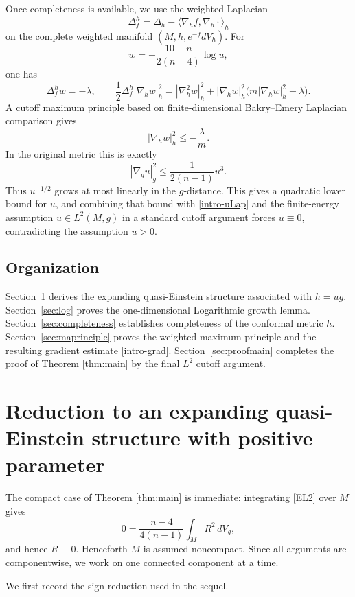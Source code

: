 \documentclass[11pt]{amsart}
\numberwithin{equation}{section}
\newcommand{\Hess}{\nabla^2}
\begin{document}
Once completeness is available, we use the weighted Laplacian
$$
        \Delta_f^h=\Delta_h-\langle\nabla_h f,\nabla_h\cdot\rangle_h
$$
on the complete weighted manifold $(M,h,e^{-f}dV_h)$.  For
$$
        w=-\frac{10-n}{2(n-4)}\log u,
$$
one has
$$
        \Delta_f^h w=-\lambda,
        \qquad
        \frac12\Delta_f^h |\nabla_h w|_h^2
        =|\Hess_h w|_h^2+|\nabla_h w|_h^2\bigl(m|\nabla_h w|_h^2+\lambda\bigr).
$$
A cutoff maximum principle based on finite-dimensional Bakry--Emery Laplacian comparison gives
$$
        |\nabla_h w|_h^2\le -\frac{\lambda}{m}.
$$
In the original metric this is exactly
\begin{equation}\label{intro-grad}
        |\nabla_g u|_g^2\le \frac1{2(n-1)}u^3 .
\end{equation}
Thus $u^{-1/2}$ grows at most linearly in the $g$-distance.  This gives a quadratic lower bound for $u$, and combining that bound with \eqref{intro-uLap} and the finite-energy assumption $u\in L^2(M,g)$ in a standard cutoff argument forces $u\equiv0$, contradicting the assumption $u>0$.

\subsection{Organization}

Section~\ref{sec:reduction} derives the expanding quasi-Einstein structure associated with $h=ug$.  Section~\ref{sec:log} proves the one-dimensional Logarithmic growth lemma.  Section~\ref{sec:completeness} establishes completeness of the conformal metric $h$.  Section~\ref{sec:maprinciple} proves the weighted maximum principle and the resulting gradient estimate \eqref{intro-grad}.  Section~\ref{sec:proofmain} completes the proof of Theorem \ref{thm:main} by the final $L^2$ cutoff argument.

\section{Reduction to an expanding quasi-Einstein structure with positive parameter}\label{sec:reduction}

The compact case of Theorem \ref{thm:main} is immediate: integrating \eqref{EL2} over $M$ gives
$$
        0=\frac{n-4}{4(n-1)}\int_M R^2\,dV_g,
$$
and hence $R\equiv 0$.  Henceforth $M$ is assumed noncompact.  Since all arguments are componentwise, we work on one connected component at a time.

We first record the sign reduction used in the sequel.
\end{document}
